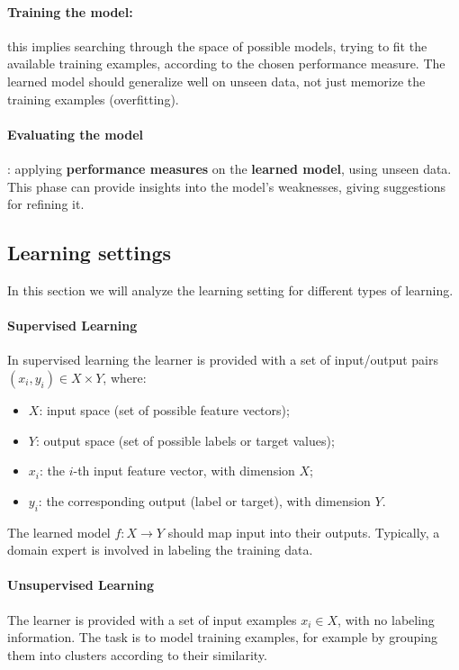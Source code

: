 \paragraph{Training the model:} this implies searching through the space of possible models, 
trying to fit the available training examples, according to the chosen performance measure.
The learned model should generalize well on unseen data, not just memorize the training examples (overfitting).

\paragraph{Evaluating the model}: applying \textbf{performance measures} on the \textbf{learned model}, using unseen data.
This phase can provide insights into the model's weaknesses, giving suggestions for refining it.

\subsection{Learning settings}
In this section we will analyze the learning setting for different types of learning.
\paragraph{Supervised Learning}
\label{Supervised-learning}
In supervised learning the learner is provided with a set of input/output pairs $(x_i, y_i) \in X \times Y$, where:
\begin{itemize}
    \item $X$: input space (set of possible feature vectors);
    \item $Y$: output space (set of possible labels or target values);
    \item $x_i$: the $i$-th input feature vector, with dimension $X$;
    \item $y_i$: the corresponding output (label or target), with dimension $Y$.
\end{itemize}
The learned model $f:X\rightarrow Y$ should map input into their outputs.
Typically, a domain expert is involved in labeling the training data.

\paragraph{Unsupervised Learning}
The learner is provided with a set of input examples $x_i \in X$, with no labeling information. 
The task is to model training examples, for example by grouping them into clusters according to their similarity.


